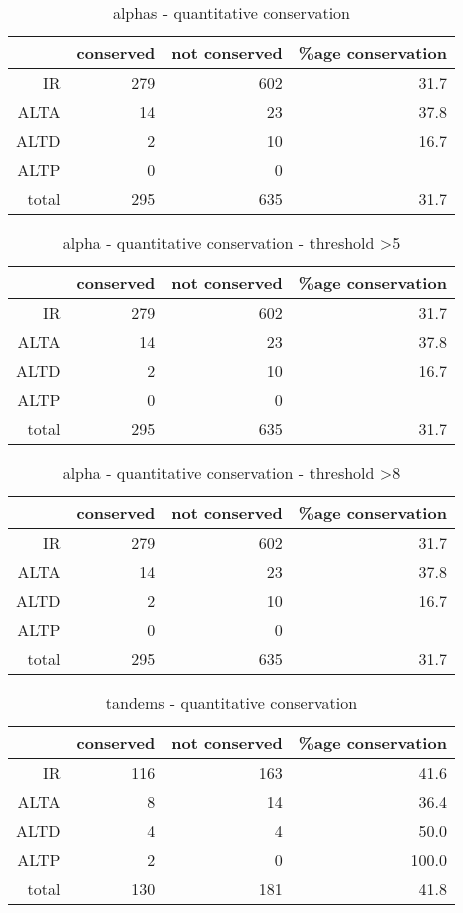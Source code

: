 \documentclass{article}
\begin{document}
\begin{table}[ht]
\centering
\begin{tabular}{rrrr}
  \hline
 & conserved & not conserved & \%age conservation \\ 
  \hline
IR & 279 & 602 & 31.7 \\ 
  ALTA & 14 & 23 & 37.8 \\ 
  ALTD & 2 & 10 & 16.7 \\ 
  ALTP & 0 & 0 &  \\ 
  total & 295 & 635 & 31.7 \\ 
   \hline
\end{tabular}
\caption{alphas - quantitative conservation} 
\end{table}%
\begin{table}[ht]
\centering
\begin{tabular}{rrrr}
  \hline
 & conserved & not conserved & \%age conservation \\ 
  \hline
IR & 279 & 602 & 31.7 \\ 
  ALTA & 14 & 23 & 37.8 \\ 
  ALTD & 2 & 10 & 16.7 \\ 
  ALTP & 0 & 0 &  \\ 
  total & 295 & 635 & 31.7 \\ 
   \hline
\end{tabular}
\caption{alpha - quantitative conservation - threshold >5} 
\end{table}%
\begin{table}[ht]
\centering
\begin{tabular}{rrrr}
  \hline
 & conserved & not conserved & \%age conservation \\ 
  \hline
IR & 279 & 602 & 31.7 \\ 
  ALTA & 14 & 23 & 37.8 \\ 
  ALTD & 2 & 10 & 16.7 \\ 
  ALTP & 0 & 0 &  \\ 
  total & 295 & 635 & 31.7 \\ 
   \hline
\end{tabular}
\caption{alpha - quantitative conservation - threshold >8} 
\end{table}%
\begin{table}[ht]
\centering
\begin{tabular}{rrrr}
  \hline
 & conserved & not conserved & \%age conservation \\ 
  \hline
IR & 116 & 163 & 41.6 \\ 
  ALTA & 8 & 14 & 36.4 \\ 
  ALTD & 4 & 4 & 50.0 \\ 
  ALTP & 2 & 0 & 100.0 \\ 
  total & 130 & 181 & 41.8 \\ 
   \hline
\end{tabular}
\caption{tandems - quantitative conservation} 
\end{table}%
\end{document}
